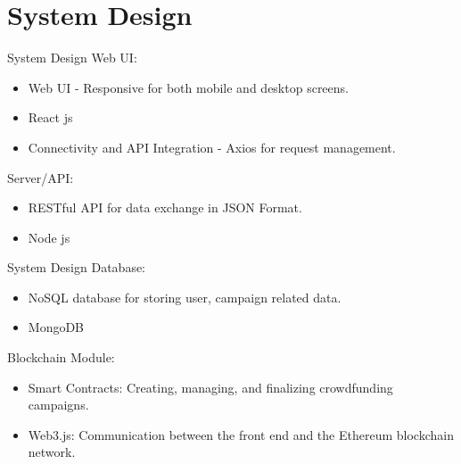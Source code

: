 \documentclass{beamer}
\begin{document}
\section{System Design}
    \begin{frame}{System Design}
        Web UI:
        \begin{itemize}
            \item Web UI - Responsive for both mobile and desktop screens.
            \item React js
            \item Connectivity and API Integration - Axios for request management.
            \end{itemize}
            \vspace{17pt}
        Server/API:
         \begin{itemize}
            \item RESTful API for data exchange in JSON Format.
            \item Node js
            \end{itemize}
    \end{frame}
    
    \begin{frame}{System Design}
   Database:
          \begin{itemize}
           \item NoSQL database for storing user, campaign related data.
           \item MongoDB
            \vspace{17pt}
        \end{itemize} 
    Blockchain Module:
           \begin{itemize}
             \item  Smart Contracts: Creating, managing, and finalizing crowdfunding campaigns.
             \item Web3.js: Communication between the front end and the Ethereum blockchain network.
             \end{itemize} 
    \end{frame}
    
\end{document}
